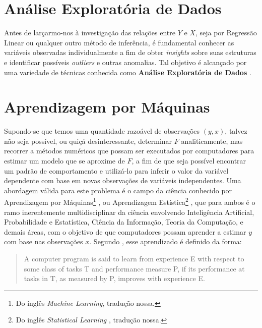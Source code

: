 \section{Análise Exploratória de Dados}

Antes de larçarmo-nos à investigação das relações entre $ Y $ e $ X $, seja por Regressão Linear ou qualquer outro método de inferência, é fundamental conhecer as variáveis observadas individualmente a fim de obter \textit{insights} sobre suas estruturas e identificar possíveis \textit{outliers} e outras anomalias. Tal objetivo é alcançado por uma variedade de técnicas conhecida como \textbf{Análise Exploratória de Dados} \cite{NIST}. 

\fi



\iffalse


\section{Aprendizagem por Máquinas}\label{sec:aprendizagem_maquinas}

Supondo-se que temos uma quantidade razoável de observações $ (y,x)  $, talvez não seja possível, ou quiçá desinteressante, determinar $ F $ analiticamente, mas recorrer a métodos numéricos que possam ser executados por computadores para estimar um modelo que se aproxime de $ F $, a fim de que seja possível encontrar um padrão de comportamento e utilizá-lo para inferir o valor da variável dependente com base em novas observações de variáveis independentes. Uma abordagem válida para este problema é o campo da ciência conhecido por  Aprendizagem por Máquinas\footnote{Do inglês \textit{Machine Learning}, tradução nossa.} \cite[p.2]{Mitchell}, ou Aprendizagem Estística\footnote{Do inglês \textit{Statistical Learning }, tradução nossa.} \cite[p.4]{Hastie}, que para ambos é o ramo inerentemente multidisciplinar da ciência envolvendo Inteligência Artificial, Probabilidade e Estatística, Ciência da Informação, Teoria da Computação, e demais áreas, com o objetivo de que computadores possam aprender a estimar $ y $ com base nas observações $ x $. Segundo \cite{Mitchell}, esse aprendizado é definido da forma:

\begin{quotation}
A computer program is said to learn from experience E with respect to some class of tasks T and performance measure P, if its performance at tasks in T, as measured by P, improves with experience E. 
\end{quotation}

